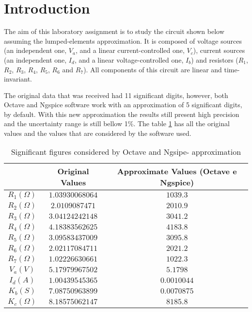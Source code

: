 \section{Introduction}
\label{sec:introduction}

\par
The aim of this laboratory assignment is to study the circuit shown below assuming the lumped-elements approximation. It is composed of voltage sources (an independent one, $V_a$, and a linear current-controlled one, $V_c$), current sources (an independent one, $I_d$, and a linear voltage-controlled one, $I_b$) and resistors ($R_1$, $R_2$, $R_3$, $R_4$, $R_5$, $R_6$ and $R_7$). All components of this circuit are linear and time-invariant.

The original data that was received had 11 significant digits, however, both Octave and Ngspice software work with an approximation of 5 significant digits, by default. With this new approximation the results still present high precision and the uncertainty range is still bellow 1\%. The table \ref{tab:ap} has all the original values and the values that are considered by the software used. 

\begin{table}[hbt!]
  \centering
  \begin{tabular}{|c|c|c|}
    \hline
    &           \textbf{Original Values}        & \textbf{Approximate Values (Octave e Ngspice)}\\ \hline
    $R_1 (\Omega)$   &  $   1.03930068064   $     & $1039.3$\\ \hline
    $R_2 (\Omega)$   &  $   2.0109087471    $      & $2010.9$\\ \hline
    $R_3 (\Omega)$   &  $   3.04124242148   $    & $3041.2$\\ \hline
    $R_4 (\Omega)$   &  $   4.18383562625   $     & $4183.8$\\ \hline
    $R_5 (\Omega)$   &  $   3.09583437009   $     & $3095.8$\\ \hline
    $R_6 (\Omega)$   &  $   2.02117084711   $     & $2021.2$\\ \hline
    $R_7 (\Omega)$   &  $   1.02226630661   $     & $1022.3$\\\hline
    $V_a (V)$   &  $   5.17979967502   $     & $5.1798$\\ \hline
    $I_d (A)$   &  $    1.00439545365     $     & $0.0010044$\\ \hline
    $K_b (S)$   &  $    7.08750963899     $     & $0.0070875$\\ \hline
    $K_c (\Omega)$   &     $8.18575062147    $     & $8185.8$\\ \hline
  \end{tabular}
  \caption{Significant figures considered by Octave and Ngsipe- approximation} 
  \label{tab:ap}
\end{table}


